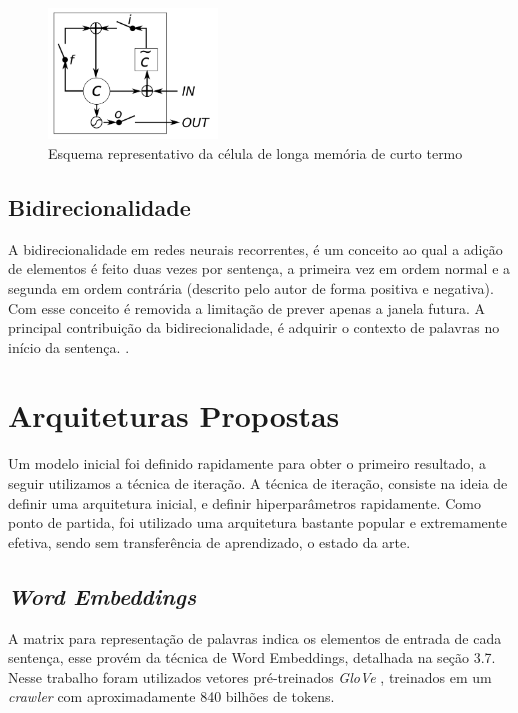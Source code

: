 \documentclass[12pt]{article}
\begin{document}
\begin{figure}[!htb]
\centering
\includegraphics[width=0.4\textwidth]{images/lstm_gate.png}
\caption{Esquema representativo da célula de longa memória de curto termo \cite{DBLP:journals/corr/ChungGCB14}}
\label{fig:lstm_date}
\end{figure}

\subsection{Bidirecionalidade}
    A bidirecionalidade em redes neurais recorrentes, é um conceito ao qual a adição de elementos é feito duas vezes por sentença, a primeira vez em ordem normal e a segunda em ordem contrária (descrito pelo autor de forma positiva e negativa). Com esse conceito é removida a limitação de prever apenas a janela futura. A principal contribuição da bidirecionalidade, é adquirir o contexto de palavras no início da sentença. \cite{schuster1997bidirectional}.

\section{Arquiteturas Propostas}

Um modelo inicial foi definido rapidamente para obter o primeiro resultado, a seguir utilizamos a técnica de iteração. A técnica de iteração, consiste na ideia de definir uma arquitetura inicial, e definir hiperparâmetros rapidamente. Como ponto de partida, foi utilizado uma arquitetura bastante popular e extremamente efetiva, sendo sem transferência de aprendizado, o estado da arte.

\subsection{\textit{Word Embeddings}}

A matrix para representação de palavras indica os elementos de entrada de cada sentença, esse provém da técnica de Word Embeddings, detalhada na seção 3.7. Nesse trabalho foram utilizados vetores pré-treinados \textit{GloVe} \cite{pennington2014glove}, treinados em um \textit{crawler} com aproximadamente 840 bilhões de tokens.
\end{document}
